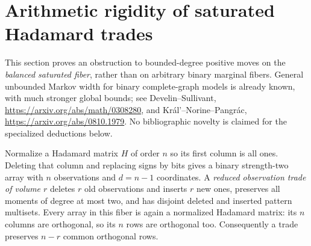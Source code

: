 \section{Arithmetic rigidity of saturated Hadamard trades}
This section proves an obstruction to bounded-degree positive moves on the
\emph{balanced saturated fiber}, rather than on arbitrary binary marginal
fibers. General unbounded Markov width for binary complete-graph models is
already known, with much stronger global bounds; see Develin--Sullivant,
\url{https://arxiv.org/abs/math/0308280}, and
Kr\'al'--Norine--Pangr\'ac,
\url{https://arxiv.org/abs/0810.1979}. No bibliographic novelty is claimed
for the specialized deductions below.

Normalize a Hadamard matrix $H$ of order $n$ so its first column is all
ones. Deleting that column and replacing signs by bits gives a binary
strength-two array with $n$ observations and $d=n-1$ coordinates.
A \emph{reduced observation trade of volume $r$} deletes $r$ old
observations and inserts $r$ new ones, preserves all moments of degree at
most two, and has disjoint deleted and inserted pattern multisets.
Every array in this fiber is again a normalized Hadamard matrix: its
$n$ columns are orthogonal, so its $n$ rows are orthogonal too.
Consequently a trade preserves $n-r$ common orthogonal rows.

